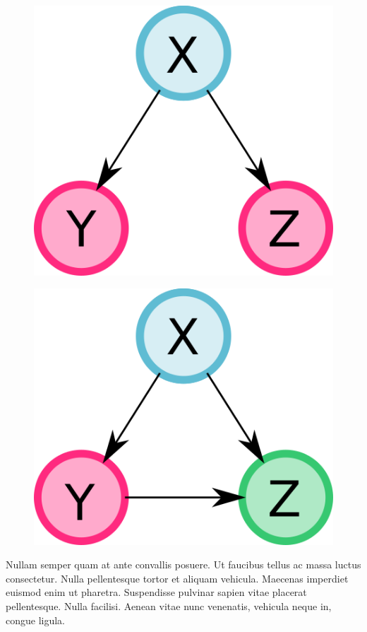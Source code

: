 \documentclass[12pt]{diazessay} %
\begin{document}
\begin{figure}[h]
	\centering
	\includegraphics[scale=0.4]{Figures/ex1.png}
\end{figure}
\begin{figure}[h]
	\centering
	\includegraphics[scale=0.4]{Figures/ex2.png}
\end{figure}

Nullam semper quam at ante convallis posuere. Ut faucibus tellus ac massa luctus consectetur. Nulla pellentesque tortor et aliquam vehicula. Maecenas imperdiet euismod enim ut pharetra. Suspendisse pulvinar sapien vitae placerat pellentesque. Nulla facilisi. Aenean vitae nunc venenatis, vehicula neque in, congue ligula.
\end{document}
